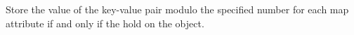 Store the value of the key-value pair modulo the specified number for each map
attribute if and only if the  hold on the object.



